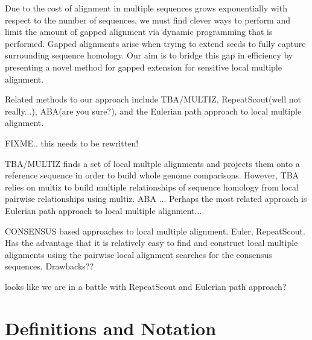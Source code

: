 \documentclass{llncs}
\begin{document}
Due to the cost of alignment in multiple sequences grows exponentially with respect to the number of sequences, we must find clever ways to perform and limit the amount of gapped alignment via dynamic programming that is performed. Gapped alignments arise when trying to extend seeds to fully capture surrounding sequence homology. Our aim is to bridge this gap in efficiency by presenting a novel method for gapped extension for sensitive local multiple alignment.


Related methods to our approach include TBA/MULTIZ, RepeatScout(well not really...), ABA(are you sure?),  and the Eulerian path approach to local multiple alignment.

FIXME.. this needs to be rewritten!

TBA/MULTIZ finds a set of local multple alignments and projects them onto a reference sequence in order to build whole genome comparisons. However, TBA relies on multiz to build multiple relationships of sequence homology from local pairwise relationships using multiz. ABA ... Perhaps the most related approach is Eulerian path approach to local multiple alignment...

CONSENSUS based approaches to local multiple alignment. Euler, RepeatScout. Has the advantage that it is relatively easy to find and construct local multiple alignments using the pairwise local alignment searches for the consensus sequences. Drawbacks?? 

looks like we are in a battle with RepeatScout and Eulerian path approach?

%



\label{sec:overview}
\section{Definitions and Notation}
\end{document}
